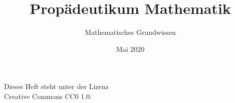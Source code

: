 \documentclass[a4paper,10pt,fleqn,twocolumn,twoside,dvipdfmx]{scrbook}
\title{Propädeutikum Mathematik}
\subtitle{Mathematisches Grundwissen}
\author{}
\date{Mai 2020}
\begin{document}
\maketitle
\clearpage

\noindent
Dieses Heft steht unter der Lizenz\\
Creative Commons CC0 1.0.

\tableofcontents






\end{document}
